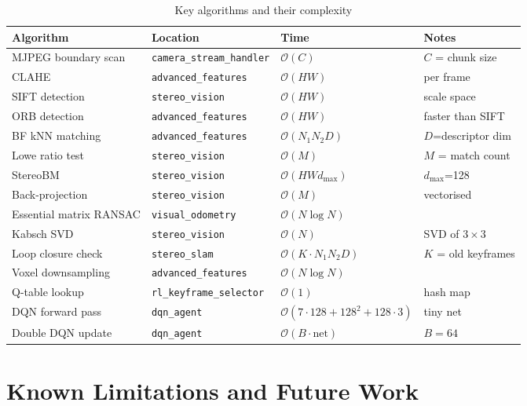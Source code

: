 \documentclass[12pt,a4paper,twoside]{report}
\theoremstyle{definition}
\newcommand{\file}[1]{\texttt{\textcolor{codeblue}{#1}}}
\begin{document}
\begin{table}[H]
\centering
\caption{Key algorithms and their complexity}\label{tab:algos}
\begin{tabular}{llll}
\toprule
\textbf{Algorithm} & \textbf{Location} & \textbf{Time} & \textbf{Notes} \\
\midrule
MJPEG boundary scan & \file{camera\_stream\_handler} & $\mathcal{O}(C)$ & $C$ = chunk size \\
CLAHE & \file{advanced\_features} & $\mathcal{O}(HW)$ & per frame \\
SIFT detection & \file{stereo\_vision} & $\mathcal{O}(HW)$ & scale space \\
ORB detection & \file{advanced\_features} & $\mathcal{O}(HW)$ & faster than SIFT \\
BF kNN matching & \file{advanced\_features} & $\mathcal{O}(N_1 N_2 D)$ & $D$=descriptor dim \\
Lowe ratio test & \file{stereo\_vision} & $\mathcal{O}(M)$ & $M$ = match count \\
StereoBM & \file{stereo\_vision} & $\mathcal{O}(HWd_{\max})$ & $d_{\max}$=128 \\
Back-projection & \file{stereo\_vision} & $\mathcal{O}(M)$ & vectorised \\
Essential matrix RANSAC & \file{visual\_odometry} & $\mathcal{O}(N\log N)$ & \\
Kabsch SVD & \file{stereo\_vision} & $\mathcal{O}(N)$ & SVD of $3\times3$ \\
Loop closure check & \file{stereo\_slam} & $\mathcal{O}(K \cdot N_1 N_2 D)$ & $K$ = old keyframes \\
Voxel downsampling & \file{advanced\_features} & $\mathcal{O}(N\log N)$ & \\
Q-table lookup & \file{rl\_keyframe\_selector} & $\mathcal{O}(1)$ & hash map \\
DQN forward pass & \file{dqn\_agent} & $\mathcal{O}(7{\cdot}128 + 128^2 + 128{\cdot}3)$ & tiny net \\
Double DQN update & \file{dqn\_agent} & $\mathcal{O}(B \cdot \text{net})$ & $B=64$ \\
\bottomrule
\end{tabular}
\end{table}

\chapter{Known Limitations and Future Work}
\end{document}
